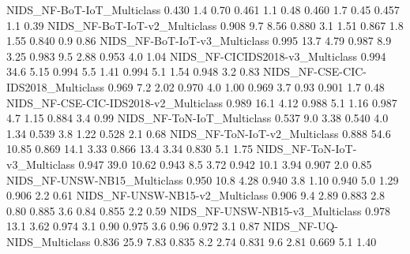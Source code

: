 NIDS_NF-BoT-IoT_Multiclass                                            0.430       1.4      0.70      0.461          1.1         0.48      0.460          1.7         0.45       0.457           1.1          0.39
NIDS_NF-BoT-IoT-v2_Multiclass                                         0.908       9.7      8.56      0.880          3.1         1.51      0.867          1.8         1.55       0.840           0.9          0.86
NIDS_NF-BoT-IoT-v3_Multiclass                                         0.995      13.7      4.79      0.987          8.9         3.25      0.983          9.5         2.88       0.953           4.0          1.04
NIDS_NF-CICIDS2018-v3_Multiclass                                      0.994      34.6      5.15      0.994          5.5         1.41      0.994          5.1         1.54       0.948           3.2          0.83
NIDS_NF-CSE-CIC-IDS2018_Multiclass                                    0.969       7.2      2.02      0.970          4.0         1.00      0.969          3.7         0.93       0.901           1.7          0.48
NIDS_NF-CSE-CIC-IDS2018-v2_Multiclass                                 0.989      16.1      4.12      0.988          5.1         1.16      0.987          4.7         1.15       0.884           3.4          0.99
NIDS_NF-ToN-IoT_Multiclass                                            0.537       9.0      3.38      0.540          4.0         1.34      0.539          3.8         1.22       0.528           2.1          0.68
NIDS_NF-ToN-IoT-v2_Multiclass                                         0.888      54.6     10.85      0.869         14.1         3.33      0.866         13.4         3.34       0.830           5.1          1.75
NIDS_NF-ToN-IoT-v3_Multiclass                                         0.947      39.0     10.62      0.943          8.5         3.72      0.942         10.1         3.94       0.907           2.0          0.85
NIDS_NF-UNSW-NB15_Multiclass                                          0.950      10.8      4.28      0.940          3.8         1.10      0.940          5.0         1.29       0.906           2.2          0.61
NIDS_NF-UNSW-NB15-v2_Multiclass                                       0.906       9.4      2.89      0.883          2.8         0.80      0.885          3.6         0.84       0.855           2.2          0.59
NIDS_NF-UNSW-NB15-v3_Multiclass                                       0.978      13.1      3.62      0.974          3.1         0.90      0.975          3.6         0.96       0.972           3.1          0.87
NIDS_NF-UQ-NIDS_Multiclass                                            0.836      25.9      7.83      0.835          8.2         2.74      0.831          9.6         2.81       0.669           5.1          1.40
